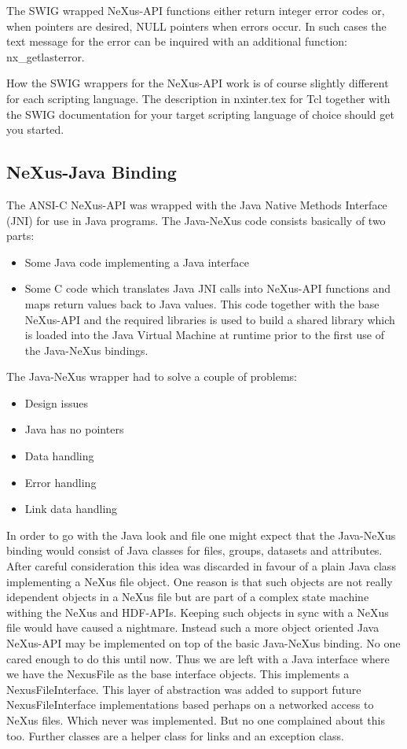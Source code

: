 \documentclass[a4paper]{article}
\begin{document}
The SWIG wrapped NeXus-API functions either return integer error codes or, when pointers are desired, 
NULL pointers when errors occur. In such cases the text message for the error can be inquired with an 
additional function: nx\_getlasterror.


How the SWIG wrappers for the NeXus-API work is of course slightly different for each scripting 
language. The description in nxinter.tex for Tcl together with the SWIG documentation for your 
target scripting language of choice should get you started. 


\subsection{NeXus-Java Binding }
The ANSI-C NeXus-API was wrapped with the Java Native Methods Interface (JNI) for use in Java 
programs. The Java-NeXus code consists basically of two parts:


\begin{itemize}\item Some Java code implementing a Java interface
\item Some C code which translates Java JNI calls into NeXus-API functions and maps return values back 
 to Java values. This code together with the base NeXus-API and the required libraries is used to 
 build a shared library which is loaded into the Java Virtual Machine at runtime prior to the first 
 use of the Java-NeXus bindings.
\end{itemize}The Java-NeXus wrapper had to solve a couple of problems:


\begin{itemize}\item Design issues
\item Java has no pointers
\item Data handling
\item Error handling
\item Link data handling
\end{itemize}In order to go with the Java look and file one might expect that the Java-NeXus binding 
would consist of Java classes for files, groups, datasets and attributes. After careful 
consideration this idea was discarded in favour of a plain Java class implementing a 
NeXus file object. One reason is that such objects are not really idependent objects in a 
NeXus file but are part of a complex state machine withing the NeXus and HDF-APIs. Keeping 
such objects in sync with a NeXus file would have caused a nightmare. Instead such a more 
object oriented Java NeXus-API may be implemented on top of the basic Java-NeXus binding. 
No one cared enough to do this until now. Thus we are left with a Java interface where we 
have the NexusFile as the base interface objects. This implements a NexusFileInterface. 
This layer of abstraction was added to support future NexusFileInterface implementations 
 based perhaps on a networked access to NeXus files. Which never was implemented. But no one
complained about this too. Further classes are a helper class for links and 
an exception class.
\end{document}
